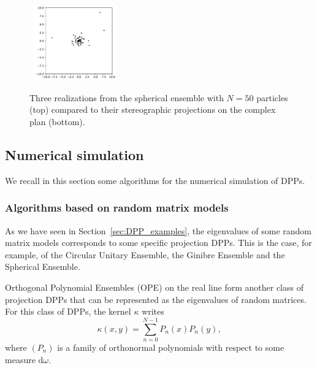 \documentclass[twoside,11pt]{book}
\newtheorem{theorem}{Theorem}
\numberwithin{theorem}{chapter}
\numberwithin{definition}{chapter}
\numberwithin{proposition}{chapter}
\numberwithin{corollary}{chapter}
\numberwithin{example}{chapter}
\numberwithin{lemma}{chapter}
\numberwithin{assumption}{chapter}
\numberwithin{equation}{chapter}
\numberwithin{figure}{chapter}
\begin{document}
\begin{figure}
~\includegraphics[width= 0.32\textwidth]{img/Spherical/Spherical_beforestero_50_example_id_3.pdf}\\
\caption{Three realizations from the spherical ensemble with $N = 50$ particles (top) compared to their stereographic projections on the complex plan (bottom). \label{fig:spherical_ensemble}}
\end{figure}



\subsection{Numerical simulation}\label{sec:num_algos_dpps}
We recall in this section some algorithms for the numerical simulation of DPPs.


\subsubsection{Algorithms based on random matrix models}
As we have seen in Section~\ref{sec:DPP_examples}, the eigenvalues of some random matrix models corresponds to some specific projection DPPs. This is the case, for example, of the Circular Unitary Ensemble, the Ginibre Ensemble and the Spherical Ensemble. 

Orthogonal Polynomial Ensembles (OPE) on the real line form another class of projection DPPs that can be represented as the eigenvalues of random matrices. For this class of DPPs, the kernel $\kappa$ writes
\begin{equation}
\kappa(x,y) = \sum\limits_{n =0}^{N-1} P_{n}(x)P_{n}(y),
\end{equation}
where $(P_{n})$ is a family of orthonormal polynomials with respect to some measure $\mathrm{d}\omega$.
\end{document}
